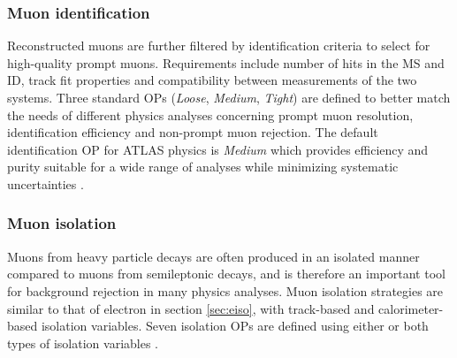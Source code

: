 \documentclass[../thesis.tex]{subfiles}
\begin{document}
\subsubsection*{Muon identification}
Reconstructed muons are further filtered by identification criteria to select for high-quality prompt muons. Requirements include number of hits in the \acs{MS} and \acs{ID}, track fit properties and compatibility between measurements of the two systems. Three standard \acs{OP}s (\textit{Loose}, \textit{Medium}, \textit{Tight}) are defined to better match the needs of different physics analyses concerning prompt muon \pT resolution, identification efficiency and non-prompt muon rejection. The default identification \acs{OP} for ATLAS physics is \textit{Medium} which provides efficiency and purity suitable for a wide range of analyses while minimizing systematic uncertainties \citep{reco:muon_ID}.


\subsubsection*{Muon isolation}
Muons from heavy particle decays are often produced in an isolated manner compared to muons from semileptonic decays, and is therefore an important tool for background rejection in many physics analyses. Muon isolation strategies are similar to that of electron in section \ref{sec:eiso}, with track-based and calorimeter-based isolation variables. Seven isolation \acs{OP}s are defined using either or both types of isolation variables \citep{reco:muon_ID}.
\end{document}
